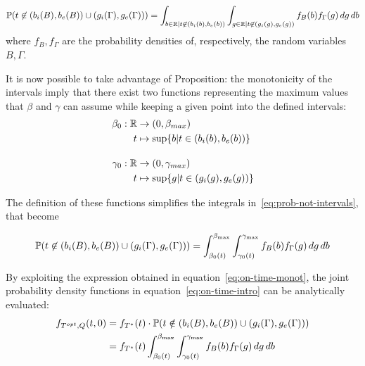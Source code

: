 \begin{equation}
  \label{eq:prob-not-intervals}
  \mathbb{P}( t \not\in (b_i(B), b_e(B)) \cup (g_i(\Gamma), g_e(\Gamma))) = \int_{b\in \mathbb{R} \vert t \not\in (b_i(b), b_e(b))}\int_{g \in \mathbb{R} \vert t \not\in (g_i(g), g_e(g))}f_B(b)f_\Gamma(g)\, dg\, db
\end{equation}
where \(f_B, f_\Gamma\) are the probability densities of, respectively, the random variables \(B, \Gamma\).


It is now possible to take advantage of Proposition:
the monotonicity of the intervals imply that there exist two functions representing the maximum values that \(\beta\) and \(\gamma\) can assume while keeping a given point into the defined intervals:
\begin{equation}
  \label{eq:def_b_0_g_0}
  \begin{split}
    \beta_0:\mathbb{R}&\rightarrow(0, \beta_{max}) \\
    t&\mapsto \sup\{b | t \in (b_i(b), b_e(b))\} \\[1em]
    \gamma_0:\mathbb{R}&\rightarrow(0, \gamma_{max}) \\
    t&\mapsto \sup\{g | t \in (g_i(g), g_e(g))\}
  \end{split}
\end{equation}

The definition of these functions simplifies the integrals in~\eqref{eq:prob-not-intervals}, that become

\begin{equation}
  \label{eq:on-time-monot}
  \mathbb{P}( t \not\in (b_i(B), b_e(B)) \cup (g_i(\Gamma), g_e(\Gamma))) = \int_{\beta_0(t)}^{\beta_{\text{max}}}\int_{\gamma_0(t)}^{\gamma_{\text{max}}}f_B(b)f_\Gamma(g)\, dg\, db
\end{equation}

By exploiting the expression obtained in equation~\eqref{eq:on-time-monot},
the joint probability density functions in equation~\eqref{eq:on-time-intro} can be analytically evaluated:
\begin{equation}
  \label{eq:on-time-final}
  \begin{split}
    f_{T^{opt}, Q}(t, 0) & = f_{T^*}(t) \cdot \mathbb{P}(t \notin (b_i(B), b_e(B)) \cup (g_i(\Gamma), g_e(\Gamma))) \\
    & = f_{T^*}(t)\int_{\beta_0(t)}^{\beta_{\text{max}}}\int_{\gamma_0(t)}^{\gamma_{\text{max}}}f_B(b)f_\Gamma(g)\, dg\, db
  \end{split}
\end{equation}

